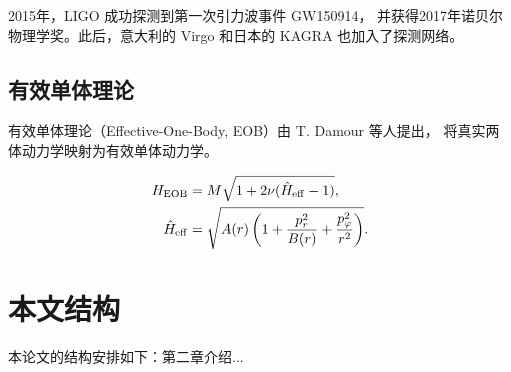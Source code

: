 \documentclass[../main.tex]{subfiles}
\begin{document}
2015年，LIGO 成功探测到第一次引力波事件 GW150914\cite{LIGOScientific:2016aoc}，
并获得2017年诺贝尔物理学奖。此后，意大利的 Virgo 和日本的 KAGRA 也加入了探测网络。

\subsection{有效单体理论}

有效单体理论（Effective-One-Body, EOB）由 T. Damour 等人提出，
将真实两体动力学映射为有效单体动力学\cite{Damour:2000we}。

\begin{align}
	H_{\rm EOB} &= M \sqrt{1 + 2\nu (\hat{H}_{\rm eff} - 1)} , \\
	\hat{H}_{\rm eff} &= \sqrt{A(r) \left(1 + \frac{p_r^2}{B(r)} + \frac{p_\varphi^2}{r^2} \right)} .
\end{align}

\section{本文结构} \label{sec:structure}

本论文的结构安排如下：第二章介绍...
\end{document}
